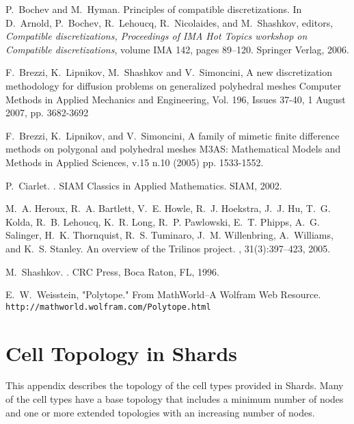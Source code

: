 \documentclass[pdf,12pt,relaxed]{SANDreport}
\begin{document}
\begin{thebibliography}{99}

P.~Bochev and M.~Hyman.
\newblock Principles of compatible discretizations.
\newblock In D.~Arnold, P.~Bochev, R.~Lehoucq, R.~Nicolaides, and M.~Shashkov,
  editors, {\em Compatible discretizations, Proceedings of IMA Hot Topics
  workshop on Compatible discretizations}, volume IMA 142, pages 89--120.
  Springer Verlag, 2006.


 F.~Brezzi, K.~Lipnikov, M.~Shashkov and V.~Simoncini,
\newblock A new discretization methodology for diffusion problems on generalized polyhedral meshes
Computer Methods in Applied Mechanics and Engineering, Vol. 196, Issues 37-40, 1 August 2007, pp. 3682-3692

 F.~Brezzi, K.~Lipnikov, and V.~Simoncini,
\newblock A family of mimetic finite difference methods on polygonal and polyhedral meshes
M3AS: Mathematical Models and Methods in Applied Sciences, v.15 n.10 (2005) pp. 1533-1552.

P.~Ciarlet.
.
\newblock SIAM Classics in Applied Mathematics. SIAM, 2002.


M.~A. Heroux, R.~A. Bartlett, V.~E. Howle, R.~J. Hoekstra, J.~J. Hu, T.~G.
  Kolda, R.~B. Lehoucq, K.~R. Long, R.~P. Pawlowski, E.~T. Phipps, A.~G.
  Salinger, H.~K. Thornquist, R.~S. Tuminaro, J.~M. Willenbring, A.~Williams,
  and K.~S. Stanley.
\newblock An overview of the {T}rilinos project.
, 31(3):397--423, 2005.

M.~Shashkov.
.
\newblock CRC Press, Boca Raton, FL, 1996.

 E.~W.~Weisstein,  "Polytope." From MathWorld--A Wolfram Web Resource. 
{\tt http://mathworld.wolfram.com/Polytope.html}

\end{thebibliography}




\appendix
\section{Cell Topology in Shards}

This appendix describes the topology of the cell types provided in Shards. Many of the cell types have a base topology that includes a minimum number of nodes and one or more extended topologies with an increasing number of nodes. 
\end{document}

